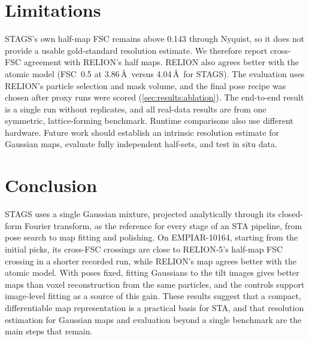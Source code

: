 \section{Limitations}
\label{sec:discussion}

STAGS's own half-map FSC remains above 0.143 through Nyquist, so it does not provide a usable gold-standard resolution estimate. We therefore report cross-FSC agreement with RELION's half maps. RELION also agrees better with the atomic model (FSC~0.5 at 3.86\,\AA\ versus 4.04\,\AA\ for STAGS).
The evaluation uses RELION's particle selection and mask volume, and the final pose recipe was chosen after proxy runs were scored (\cref{sec:results:ablation}). The end-to-end result is a single run without replicates, and all real-data results are from one symmetric, lattice-forming benchmark. Runtime comparisons also use different hardware.
Future work should establish an intrinsic resolution estimate for Gaussian maps, evaluate fully independent half-sets, and test in situ data.

\section{Conclusion}
\label{sec:conclusion}

STAGS uses a single Gaussian mixture, projected analytically through its closed-form Fourier transform, as the reference for every stage of an STA pipeline, from pose search to map fitting and polishing.
On EMPIAR-10164, starting from the initial picks, its cross-FSC crossings are close to RELION-5's half-map FSC crossing in a shorter recorded run, while RELION's map agrees better with the atomic model.
With poses fixed, fitting Gaussians to the tilt images gives better maps than voxel reconstruction from the same particles, and the controls support image-level fitting as a source of this gain.
These results suggest that a compact, differentiable map representation is a practical basis for STA, and that resolution estimation for Gaussian maps and evaluation beyond a single benchmark are the main steps that remain.
